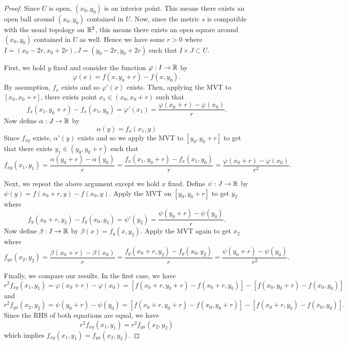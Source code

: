 \documentclass[letterpaper, twoside, 12pt]{book}
\begin{document}
\begin{proof}
    Since \(U\) is open, \((x_0, y_0)\) is an interior point. This
    means there exists an open ball around \((x_0, y_0)\) contained in \(U\).
    Now, since the metric \(s\) is compatible with the usual topology
    on \(\mathbb R^2\), this means there exists an open square around
    \((x_0, y_0)\) contained in \(U\) as well. Hence we have some \(r > 0\)
    where \(I = (x_0 - 2r, x_0 + 2r), J = (y_0 - 2r, y_0 + 2r)\) such
    that \(I \times J \subset U\).

    First, we hold \(y\) fixed and consider the function \(\varphi: I \to \mathbb R\) by
    \[ \varphi(x) = f(x, y_0 + r) - f(x, y_0) .\]
    By assumption, \(f_x\) exists and so \(\varphi'(x)\) exists. Then,
    applying the MVT to \([x_0, x_0 + r]\), there exists point \(x_1 \in (x_0, x_0 + r)\)
    such that
    \[  f_x(x_1, y_0 + r) - f_x(x_1, y_0) = \varphi'(x_1) = \frac{ \varphi(x_0 + r) - \varphi(x_0)}{r} .\]
    Now define \(\alpha: J \to \mathbb R\) by
    \[ \alpha(y) = f_x(x_1, y) \]
    Since \(f_{xy}\) exists, \(\alpha'(y)\) exists and so we apply the MVT to
    \([y_0, y_0 + r]\) to get that there exists \(y_1 \in (y_0, y_0 + r)\) such that
    \[ f_{xy}(x_1, y_1) = \frac{\alpha(y_0 + r) - \alpha(y_0)}{r} 
        = \frac{ f_x(x_1, y_0 + r) - f_x(x_1, y_0)}{r} = \frac{ \varphi(x_0 + r) - \varphi(x_0)}{r^2}. \]

    Next, we repeat the above argument except we hold \(x\) fixed. Define
    \(\psi: J \to \mathbb R\) by \(\psi(y) = f(x_0 + r, y) - f(x_0, y)\). Apply the
    MVT on \([y_0, y_0 + r]\) to get \(y_2\) where
    \[f_y(x_0 + r, y_2) - f_y(x_0, y_2) = \psi'(y_2) = \frac{ \psi(y_0 + r) - \psi(y_0)}{r} .\]
    Now define \(\beta: I \to \mathbb R\) by \(\beta(x) = f_y(x, y_2) \). Apply
    the MVT again to get \(x_2\) where
    \[ f_{yx}(x_2, y_2) = \frac{ \beta(x_0 + r) - \beta(x_0)}{r} = 
        \frac{ f_y(x_0 + r, y_2) - f_y(x_0, y_2)}{r} = \frac{ \psi(y_0 + r) - \psi(y_0)}{r^2}. \]

    Finally, we compare our results. In the first case, we have
    \[ r^2 f_{xy}(x_1, y_1) = \varphi(x_0 + r) - \varphi(x_0) 
    = [f(x_0 + r, y_0 + r) - f(x_0 + r, y_0)] - [ f(x_0, y_0 + r) - f(x_0, y_0)] \]
    and
    \[ r^2 f_{yx}(x_2, y_2) = \psi(y_0 + r) - \psi(y_0) 
    = [f(x_0 + r, y_0 + r) - f(x_0, y_0 + r)] - [ f(x_0 + r, y_0) - f(x_0, y_0)] .\]
    Since the RHS of both equations are equal, we have
    \[ r^2 f_{xy}(x_1, y_1) = r^2 f_{yx}(x_2, y_2) \]
    which implies \(f_{xy}(x_1, y_1) = f_{yx}(x_2, y_2) \).

\end{proof}
\end{document}
